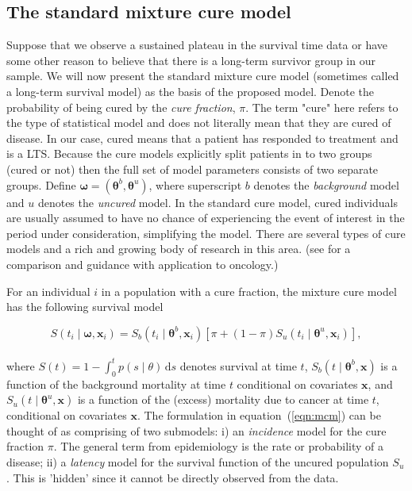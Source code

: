 \documentclass[AMA,STIX1COL]{WileyNJD-v2}
\begin{document}
\subsection{The standard mixture cure model} \label{section:basic_model}
Suppose that we observe a sustained plateau in the survival time data or have some other reason to believe that there is a long-term survivor group in our sample. We will now present the standard mixture cure model (sometimes called a long-term survival model) as the basis of the proposed model.
Denote the probability of being cured by the {\it cure fraction}, $\pi$.
The term "cure" here refers to the type of statistical model and does not literally mean that they are cured of disease. In our case, cured means that a patient has responded to treatment and is a LTS.
Because the cure models explicitly split patients in to two groups (cured or not) then the full set of model parameters consists of two separate groups.
Define $\bm\omega = (\bm\theta^b, \bm\theta^u)$, where superscript $b$ denotes the \textit{background} model and $u$ denotes the \textit{uncured} model.
In the standard cure model, cured individuals are usually assumed to have no chance of experiencing the event of interest in the period under consideration, simplifying the model.
There are several types of cure models and a rich and growing body of research in this area.
(see \citep{Yu2013} for a comparison and guidance with application to oncology.)

For an individual $i$ in a population with a cure fraction, the mixture cure model has the following survival model

\begin{equation}
\label{eqn:mcm}
S(t_{i} \mid \bm\omega, \bm{x}_i) = S_b(t_{i} \mid \bm\theta^b, \bm{x}_{i}) \left[\pi + (1 - \pi) S_u(t_{i} \mid \bm\theta^u, \bm{x}_{i}) \right],
\end{equation}
\\
\noindent
where $S(t) = 1 \!-\! \int_0^t p(s \mid \theta)\, \text{d}s$ denotes survival at time $t$,
$S_b(t \mid \bm\theta^b, \bm{x})$ is a function of the background mortality at time $t$ conditional on covariates $\bm{x}$,
and $S_u(t \mid \bm\theta^u, \bm{x})$ is a function of the (excess) mortality due to cancer at time $t$, conditional on covariates $\bm{x}$.
The formulation in equation~(\ref{eqn:mcm}) can be thought of as comprising of two submodels: i) an \textit{incidence} model for the cure fraction $\pi$. The general term from epidemiology is the rate or probability of a disease; ii) a \textit{latency} model for the survival function of the uncured population $S_u$. This is 'hidden' since it cannot be directly observed from the data.
\end{document}
